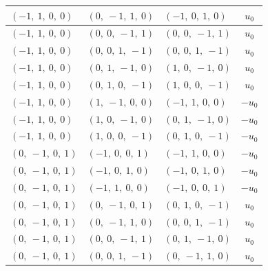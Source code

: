 \documentclass[11pt]{article}
\theoremstyle{definition}
\begin{document}
\begin{longtable}{|l|l|l|c|}
    \hline
    $\left( -1, \  1, \  0, \  0\right)$ & $\left( 0, \  -1, \  1, \  0\right)$ & $\left( -1, \  0, \  1, \  0\right)$ & $u_{0}$ \\
    \hline
    $\left( -1, \  1, \  0, \  0\right)$ & $\left( 0, \  0, \  -1, \  1\right)$ & $\left( 0, \  0, \  -1, \  1\right)$ & $u_{0}$ \\
    \hline
    $\left( -1, \  1, \  0, \  0\right)$ & $\left( 0, \  0, \  1, \  -1\right)$ & $\left( 0, \  0, \  1, \  -1\right)$ & $u_{0}$ \\
    \hline
    $\left( -1, \  1, \  0, \  0\right)$ & $\left( 0, \  1, \  -1, \  0\right)$ & $\left( 1, \  0, \  -1, \  0\right)$ & $u_{0}$ \\
    \hline
    $\left( -1, \  1, \  0, \  0\right)$ & $\left( 0, \  1, \  0, \  -1\right)$ & $\left( 1, \  0, \  0, \  -1\right)$ & $u_{0}$ \\
    \hline
    $\left( -1, \  1, \  0, \  0\right)$ & $\left( 1, \  -1, \  0, \  0\right)$ & $\left( -1, \  1, \  0, \  0\right)$ & $- u_{0}$ \\
    \hline
    $\left( -1, \  1, \  0, \  0\right)$ & $\left( 1, \  0, \  -1, \  0\right)$ & $\left( 0, \  1, \  -1, \  0\right)$ & $- u_{0}$ \\
    \hline
    $\left( -1, \  1, \  0, \  0\right)$ & $\left( 1, \  0, \  0, \  -1\right)$ & $\left( 0, \  1, \  0, \  -1\right)$ & $- u_{0}$ \\
    \hline
    $\left( 0, \  -1, \  0, \  1\right)$ & $\left( -1, \  0, \  0, \  1\right)$ & $\left( -1, \  1, \  0, \  0\right)$ & $- u_{0}$ \\
    \hline
    $\left( 0, \  -1, \  0, \  1\right)$ & $\left( -1, \  0, \  1, \  0\right)$ & $\left( -1, \  0, \  1, \  0\right)$ & $- u_{0}$ \\
    \hline
    $\left( 0, \  -1, \  0, \  1\right)$ & $\left( -1, \  1, \  0, \  0\right)$ & $\left( -1, \  0, \  0, \  1\right)$ & $- u_{0}$ \\
    \hline
    $\left( 0, \  -1, \  0, \  1\right)$ & $\left( 0, \  -1, \  0, \  1\right)$ & $\left( 0, \  1, \  0, \  -1\right)$ & $u_{0}$ \\
    \hline
    $\left( 0, \  -1, \  0, \  1\right)$ & $\left( 0, \  -1, \  1, \  0\right)$ & $\left( 0, \  0, \  1, \  -1\right)$ & $u_{0}$ \\
    \hline
    $\left( 0, \  -1, \  0, \  1\right)$ & $\left( 0, \  0, \  -1, \  1\right)$ & $\left( 0, \  1, \  -1, \  0\right)$ & $u_{0}$ \\
    \hline
    $\left( 0, \  -1, \  0, \  1\right)$ & $\left( 0, \  0, \  1, \  -1\right)$ & $\left( 0, \  -1, \  1, \  0\right)$ & $u_{0}$ \\

\end{longtable}
\end{document}
